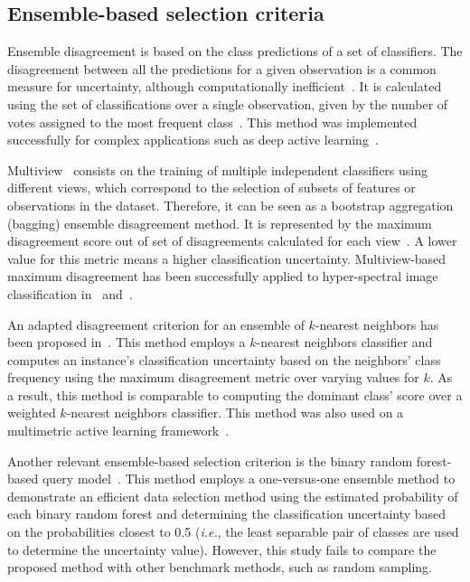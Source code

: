 \documentclass[parskip=full]{scrartcl}
\begin{document}
\subsection{Ensemble-based selection criteria}

Ensemble disagreement is based on the class predictions of a set of
classifiers. The disagreement between all the predictions for a given
observation is a common measure for uncertainty, although computationally
inefficient~\cite{Ruzicka2020,Pasolli2016}. It is calculated using the set of
classifications over a single observation, given by the number of votes
assigned to the most frequent class~\cite{Shrivastava2021}. This method was
implemented successfully for complex applications such as deep active
learning~\cite{Ruzicka2020}.

Multiview~\cite{Muslea2006} consists on the training of multiple independent
classifiers using different views, which correspond to the selection of subsets
of features or observations in the dataset. Therefore, it can be seen as a
bootstrap aggregation (bagging) ensemble disagreement method. It is represented
by the maximum disagreement score out of set of disagreements calculated for
each view~\cite{Shrivastava2021}. A lower value for this metric means a higher
classification uncertainty. Multiview-based maximum disagreement has been
successfully applied to hyper-spectral image classification in~\cite{Di2012}
and~\cite{Zhou2014}.

An adapted disagreement criterion for an ensemble of $k$-nearest neighbors has
been proposed in~\cite{Pasolli2016}. This method employs a $k$-nearest
neighbors classifier and computes an instance's classification uncertainty
based on the neighbors' class frequency using the maximum disagreement metric
over varying values for $k$. As a result, this method is comparable to
computing the dominant class' score over a weighted $k$-nearest neighbors
classifier. This method was also used on a multimetric active learning
framework~\cite{Zhang2016}.

Another relevant ensemble-based selection criterion is the binary random
forest-based query model~\cite{Su2020}. This method employs a one-versus-one
ensemble method to demonstrate an efficient data selection method using the
estimated probability of each binary random forest and determining the
classification uncertainty based on the probabilities closest to 0.5
(\textit{i.e.}, the least separable pair of classes are used to determine the
uncertainty value). However, this study fails to compare the proposed method
with other benchmark methods, such as random sampling.
\end{document}
